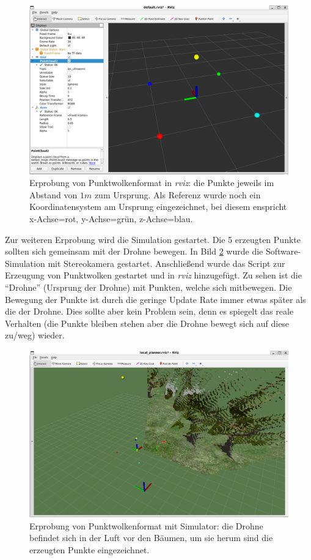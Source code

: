 \begin{figure}[!h]
    \centering
    \includegraphics[width=0.7\linewidth]{images/ultra_pc_test.png}
    \caption[Erprobung von Punktwolkenformat]{Erprobung von Punktwolkenformat in \textit{rviz}: die Punkte jeweils im Abstand von $1m$ zum Ursprung. Als Referenz wurde noch ein Koordinatensystem am Ursprung eingezeichnet, bei diesem enspricht x-Achse=rot, y-Achse=grün, z-Achse=blau.}
    \label{fig:ultra_pc_test}
\end{figure}

Zur weiteren Erprobung wird die Simulation gestartet. Die 5 erzeugten Punkte sollten sich gemeinsam mit der Drohne bewegen. In Bild \ref{fig:ultra_pc_test_sim} wurde die Software-Simulation mit Stereokamera gestartet. Anschließend wurde das Script zur Erzeugung von Punktwolken gestartet und in \textit{rviz} hinzugefügt. Zu sehen ist die \enquote{Drohne} (Ursprung der Drohne) mit Punkten, welche sich mitbewegen. Die Bewegung der Punkte ist durch die geringe Update Rate immer etwas später als die der Drohne. Dies sollte aber kein Problem sein, denn es spiegelt das reale Verhalten (die Punkte bleiben stehen aber die Drohne bewegt sich auf diese zu/weg) wieder.

\begin{figure}[!h]
    \centering
    \includegraphics[width=0.7\linewidth]{images/ultra_pc_test_sim.png}
    \caption[Erprobung von Punktwolkenformat mit Simulator]{Erprobung von Punktwolkenformat mit Simulator: die Drohne befindet sich in der Luft vor den Bäumen, um sie herum sind die erzeugten Punkte eingezeichnet.}
    \label{fig:ultra_pc_test_sim}
\end{figure}

